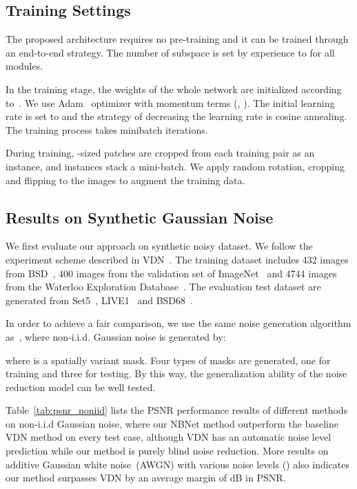 \documentclass[final]{cvpr}
\begin{document}
\subsection{Training Settings}
The proposed architecture requires no pre-training and it can be trained through an end-to-end strategy. The number of subspace  is set by experience to  for all modules.

In the training stage, the weights of the whole network are initialized according to~\cite{he2015delving}. We use Adam~\cite{kingma2014adam} optimizer with momentum terms (, ). The initial learning rate is set to  and the strategy of decreasing the learning rate is cosine annealing. The training process takes  minibatch iterations.



During training, -sized patches are cropped from each training pair as an instance, and
 instances stack a mini-batch. We apply random rotation, cropping and flipping to the images to augment the training data. 


\subsection{Results on Synthetic Gaussian Noise}
We first evaluate our approach on synthetic noisy dataset. We follow the experiment scheme
described in VDN~\cite{yue2019variational}. 
The training dataset includes 432 images from BSD~\cite{arbelaez2010contour}, 400 images from the validation set of ImageNet~\cite{deng2014scalable} and 4744 images from the Waterloo Exploration Database~\cite{ma2016waterloo}.
The evaluation test dataset are generated from Set5~\cite{kim2016accurate}, LIVE1~\cite{kim2016accurate} and BSD68~\cite{amfm_pami2011}.

In order to achieve a fair comparison, we use the same noise generation algorithm as~\cite{yue2019variational}, where non-i.i.d. Gaussian noise is generated by:

where  is a spatially variant mask. Four types of masks are generated, one for 
training and three for testing. By this way, the generalization ability of the noise reduction
model can be well tested.


Table~\ref{tab:psnr_noniid} lists the PSNR performance results of different methods on 
non-i.i.d Gaussian noise, where our NBNet method outperform the baseline VDN method on
every test case, although VDN has an automatic noise level prediction while our method
is purely blind noise reduction. More results on additive Gaussian white noise~(AWGN)
with various noise levels () also indicates our method surpasses VDN
by an average margin of  dB in PSNR.
\end{document}
